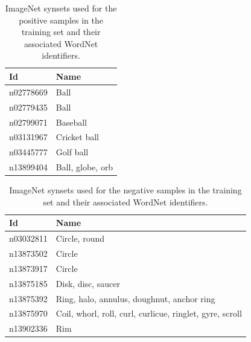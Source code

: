 \documentclass{sig-alternate-05-2015}
\begin{document}
{{      %
			\begin{table}[t]
				\centering
				\caption{ImageNet synsets used for the positive samples in the training set and their associated WordNet identifiers.}
				\label{tab:positive_samples}
				\begin{tabularx}{1.0\columnwidth}{@{}lX@{}}
					\toprule
					\textbf{Id} & \textbf{Name} \\
					\midrule
						n02778669 & Ball \\
						n02779435 & Ball \\
						n02799071 & Baseball \\
						n03131967 & Cricket ball \\
						n03445777 & Golf ball \\
						n13899404 & Ball, globe, orb \\
					\bottomrule
				\end{tabularx}
			\end{table}

      \begin{table}[t]
        \centering
        \caption{ImageNet synsets used for the negative samples in the training set and their associated WordNet identifiers.}
				\label{tab:negative_samples}
        \begin{tabularx}{1.0\columnwidth}{@{}lX@{}}
          \toprule
          \textbf{Id} & \textbf{Name} \\
          \midrule
            n03032811 & Circle, round \\
            n13873502 & Circle \\
            n13873917 & Circle \\
            n13875185 & Disk, disc, saucer \\
            n13875392 & Ring, halo, annulus, doughnut, anchor ring \\
            n13875970 & Coil, whorl, roll, curl, curlicue, ringlet, gyre, scroll \\
            n13902336 & Rim \\
          \bottomrule
        \end{tabularx}
      \end{table}

}}
\end{document}
